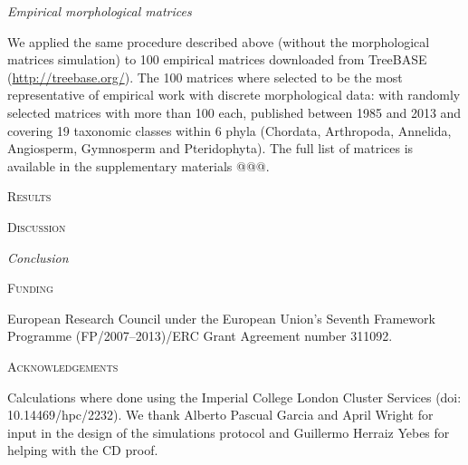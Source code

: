 \documentclass[12pt,letterpaper]{article}
\renewcommand{\section}[1]{%
\bigskip
\begin{center}
\begin{Large}
\normalfont\scshape #1
\medskip
\end{Large}
\end{center}}
\renewcommand{\subsection}[1]{%
\bigskip
\begin{center}
\begin{large}
\normalfont\itshape #1
\end{large}
\end{center}}
\begin{document}
\subsection{Empirical morphological matrices}

We applied the same procedure described above (without the morphological matrices simulation) to 100 empirical matrices downloaded from TreeBASE (\url{http://treebase.org/}).
The 100 matrices where selected to be the most representative of empirical work with discrete morphological data: with randomly selected matrices with more than 100 each, published between 1985 and 2013 and covering 19 taxonomic classes within 6 phyla (Chordata, Arthropoda, Annelida, Angiosperm, Gymnosperm and Pteridophyta).
The full list of matrices is available in the supplementary materials @@@.

\section{Results}


\section{Discussion}


\subsection{Conclusion}


\section{Funding}
European Research Council under the European Union’s Seventh Framework Programme (FP/2007–2013)/ERC Grant Agreement number 311092.


\section{Acknowledgements}
Calculations where done using the Imperial College London Cluster Services (doi: 10.14469/hpc/2232).
We thank Alberto Pascual Garcia and April Wright for input in the design of the simulations protocol and Guillermo Herraiz Yebes for helping with the CD proof.






\end{document}
